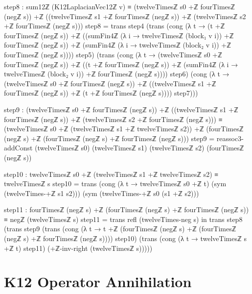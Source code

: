 \documentclass[11pt,a4paper]{book}
\def\texorpdfstring#1#2{#2}%
\begin{document}
\begin{code}
      step8 :
        sum12ℤ (K12LaplacianVec12ℤ v) ≡
          (twelveTimesℤ s0 +ℤ fourTimesℤ (negℤ s)) +ℤ
          ((twelveTimesℤ s1 +ℤ fourTimesℤ (negℤ s)) +ℤ (twelveTimesℤ s2 +ℤ fourTimesℤ (negℤ s)))
      step8 =
        trans
          step4
          (trans
            (cong
              (λ t → (t +ℤ fourTimesℤ (negℤ s)) +ℤ ((sumFin4ℤ (λ i → twelveTimesℤ (block₁ v i)) +ℤ fourTimesℤ (negℤ s)) +ℤ (sumFin4ℤ (λ i → twelveTimesℤ (block₂ v i)) +ℤ fourTimesℤ (negℤ s))))
              step5)
            (trans
              (cong
                (λ t → (twelveTimesℤ s0 +ℤ fourTimesℤ (negℤ s)) +ℤ ((t +ℤ fourTimesℤ (negℤ s)) +ℤ (sumFin4ℤ (λ i → twelveTimesℤ (block₂ v i)) +ℤ fourTimesℤ (negℤ s))))
                step6)
              (cong
                (λ t → (twelveTimesℤ s0 +ℤ fourTimesℤ (negℤ s)) +ℤ ((twelveTimesℤ s1 +ℤ fourTimesℤ (negℤ s)) +ℤ (t +ℤ fourTimesℤ (negℤ s))))
                step7)))

      step9 :
        (twelveTimesℤ s0 +ℤ fourTimesℤ (negℤ s)) +ℤ
        ((twelveTimesℤ s1 +ℤ fourTimesℤ (negℤ s)) +ℤ (twelveTimesℤ s2 +ℤ fourTimesℤ (negℤ s))) ≡
          (twelveTimesℤ s0 +ℤ (twelveTimesℤ s1 +ℤ twelveTimesℤ s2)) +ℤ
          (fourTimesℤ (negℤ s) +ℤ (fourTimesℤ (negℤ s) +ℤ fourTimesℤ (negℤ s)))
      step9 = reassoc3-addConst (twelveTimesℤ s0) (twelveTimesℤ s1) (twelveTimesℤ s2) (fourTimesℤ (negℤ s))

      step10 : twelveTimesℤ s0 +ℤ (twelveTimesℤ s1 +ℤ twelveTimesℤ s2) ≡ twelveTimesℤ s
      step10 =
        trans
          (cong (λ t → twelveTimesℤ s0 +ℤ t) (sym (twelveTimes-+ℤ s1 s2)))
          (sym (twelveTimes-+ℤ s0 (s1 +ℤ s2)))

      step11 : fourTimesℤ (negℤ s) +ℤ (fourTimesℤ (negℤ s) +ℤ fourTimesℤ (negℤ s)) ≡ negℤ (twelveTimesℤ s)
      step11 = trans refl (twelveTimes-neg s)
    in
    trans
      step8
      (trans
        step9
        (trans
          (cong
            (λ t → t +ℤ (fourTimesℤ (negℤ s) +ℤ (fourTimesℤ (negℤ s) +ℤ fourTimesℤ (negℤ s))))
            step10)
          (trans
            (cong (λ t → twelveTimesℤ s +ℤ t) step11)
            (+ℤ-inv-right (twelveTimesℤ s)))))
\end{code}

\section{K\texorpdfstring{$_{12}$}{12} Operator Annihilation}
\end{document}
